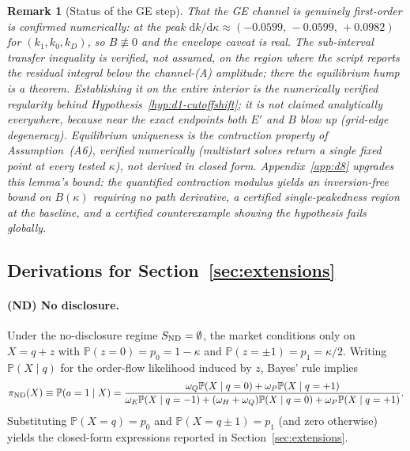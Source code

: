 \documentclass[11pt]{article}
\newcommand{\PP}{\mathbb{P}}
\newcommand{\1}{\mathbf{1}}
\newtheorem{remark}{Remark}
\begin{document}
\begin{remark}[Status of the GE step]
That the GE channel is genuinely first-order is confirmed numerically: at the
peak $\mathrm{d} k/\mathrm{d}\kappa\approx(-0.0599,\,-0.0599,\,+0.0982)$ for
$(k_1,k_0,k_D)$, so $B\not\equiv0$ and the envelope caveat is real. The
sub-interval transfer inequality is verified, not assumed, on the region where
the script reports the residual integral below the channel-(A) amplitude; there
the equilibrium hump is a theorem. Establishing it on the \emph{entire} interior
is the numerically verified regularity behind
Hypothesis~\ref{hyp:d1-cutoffshift}; it is not claimed analytically everywhere,
because near the exact endpoints both $E'$ and $B$ blow up (grid-edge
degeneracy). Equilibrium uniqueness is the contraction property of
Assumption~\textup{(A6)}, verified numerically (multistart solves return a
single fixed point at every tested $\kappa$), not derived in closed form.
Appendix~\ref{app:d8} upgrades this lemma's bound: the quantified contraction
modulus yields an inversion-free bound on $B(\kappa)$ requiring no path
derivative, a certified single-peakedness region at the baseline, and a
certified counterexample showing the hypothesis fails globally.
\end{remark}

\subsection{Derivations for Section~\ref{sec:extensions}}
\label{app:extensions-derivations}

\paragraph{(ND) No disclosure.}
Under the no-disclosure regime $S_{\textup{ND}}=\emptyset$, the market conditions only on $X=q+z$ with
$\PP(z=0)=p_0=1-\kappa$ and $\PP(z=\pm1)=p_1=\kappa/2$. Writing $\PP(X \mid q)$ for the order-flow likelihood induced by $z$, Bayes' rule implies
\[
\pi_{\textup{ND}}(X)\equiv \PP(a=1 \mid X)
=\frac{\omega_Q\PP(X \mid q=0)+\omega_P\PP(X \mid q=+1)}
{\omega_E\PP(X \mid q=-1)+(\omega_H+\omega_Q)\PP(X \mid q=0)+\omega_P\PP(X \mid q=+1)}.
\]
Substituting $\PP(X=q)=p_0$ and $\PP(X=q\pm1)=p_1$ (and zero otherwise) yields the closed-form expressions reported in Section~\ref{sec:extensions}.
\end{document}
